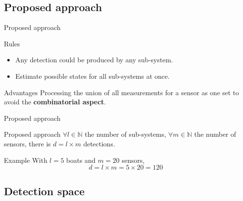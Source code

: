\documentclass{beamer}
\begin{document}
        \subsection{Proposed approach}

            \begin{frame}{Proposed approach}
                \begin{block}{Rules}
                    \begin{itemize}
                        \item Any detection could be produced by any sub-system.
                        \item Estimate possible states for all sub-systems at once.
                    \end{itemize}
                \end{block}
                \begin{block}{Advantages}
                    Processing the union of all measurements for a sensor as one set to avoid the \textbf{combinatorial aspect}.
                \end{block}
            \end{frame}

            \begin{frame}{Proposed approach}
                \begin{block}{Proposed approach}
                    $\forall l \in \mathbb{N}$ the number of sub-systems, $\forall m \in \mathbb{N}$ the number of sensors, there is $d = l \times m$ detections.
                \end{block}
                \begin{exampleblock}{Example}
                    With $l = 5$ boats and $m = 20$ sensors,
                    $$d = l \times m = 5 \times 20 = 120$$
                \end{exampleblock}
            \end{frame}

        \subsection{Detection space}
\end{document}
